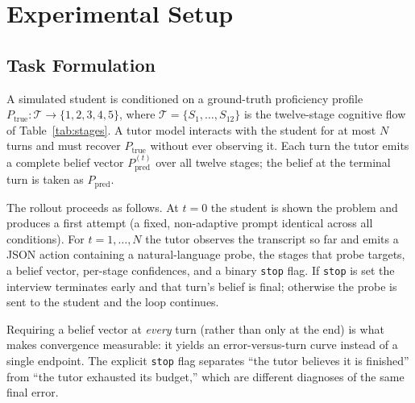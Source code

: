 %
%

\appendix

\section{Experimental Setup}
\label{app:setup}

\subsection{Task Formulation}
\label{app:task}

A simulated student is conditioned on a ground-truth proficiency profile
$P_{\text{true}} : \mathcal{T} \rightarrow \{1,2,3,4,5\}$, where $\mathcal{T} =
\{S_1,\dots,S_{12}\}$ is the twelve-stage cognitive flow of
Table~\ref{tab:stages}. A tutor model interacts with the student for at most
$N$ turns and must recover $P_{\text{true}}$ without ever observing it. Each
turn the tutor emits a complete belief vector $P^{(t)}_{\text{pred}}$ over all
twelve stages; the belief at the terminal turn is taken as
$P_{\text{pred}}$.

The rollout proceeds as follows. At $t=0$ the student is shown the problem and
produces a first attempt (a fixed, non-adaptive prompt identical across all
conditions). For $t = 1,\dots,N$ the tutor observes the transcript so far and
emits a JSON action containing a natural-language probe, the stages that probe
targets, a belief vector, per-stage confidences, and a binary \texttt{stop}
flag. If \texttt{stop} is set the interview terminates early and that turn's
belief is final; otherwise the probe is sent to the student and the loop
continues.

Requiring a belief vector at \emph{every} turn (rather than only at the end)
is what makes convergence measurable: it yields an error-versus-turn curve
instead of a single endpoint. The explicit \texttt{stop} flag separates
``the tutor believes it is finished'' from ``the tutor exhausted its budget,''
which are different diagnoses of the same final error.

